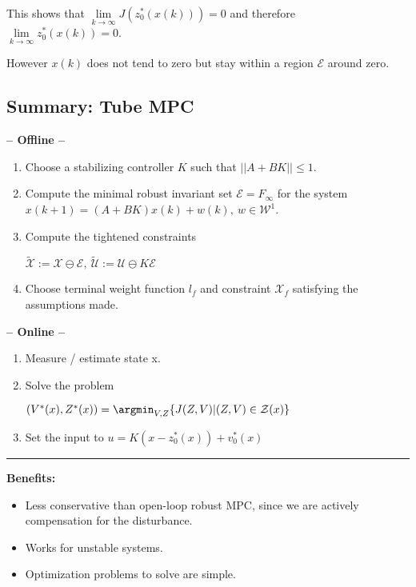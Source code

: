\documentclass[8pt,a4paper]{scrartcl}
\begin{document}
\begin{multicols*}{3}
\begin{multicols*}{4}
{This shows that $\lim\limits_{k\rightarrow\infty}J(z_0^\ast(x(k)))=0$ and therefore $\lim\limits_{k\rightarrow\infty}z_0^\ast(x(k))=0$.

\finn

However $x(k)$ does not tend to zero but stay within a region $\mathcal{E}$ around zero.
}%

\subsection{Summary: Tube MPC}

\textbf{-- Offline --}
\begin{enumerate}

\item Choose a stabilizing controller $K$ such that $||A+BK||\leq 1$.
\item Compute the minimal robust invariant set $\mathcal{E}=F_\infty$ for the system $x(k+1)=(A+BK)x(k)+w(k),\ w\in\mathcal{W}^1$.
\item Compute the tightened constraints 

$\tilde{\mathcal{X}}:=\mathcal{X}\ominus\mathcal{E},\ \tilde{\mathcal{U}}:=\mathcal{U}\ominus K\mathcal{E}$
\item Choose terminal weight function $l_f$ and constraint $\mathcal{X}_f$ satisfying the assumptions made.
\end{enumerate}

\textbf{-- Online --}
\begin{enumerate}
\compaq
\item Measure / estimate state x.
\item Solve the problem 

$(V^\ast(x),Z^\ast(x))=\argmin_{V,Z}\{J(Z,V)|(Z,V)\in\mathcal{Z}(x)\}$
\item Set the input to $u=K(x-z_0^\ast(x))+v_0^\ast(x)$
\end{enumerate}

\hrule

\finn

\textbf{Benefits:}
\begin{itemize}

\item Less conservative than open-loop robust MPC, since we are actively compensation for the disturbance.
\item Works for unstable systems.
\item Optimization problems to solve are simple.
\end{itemize}


\end{multicols*}
\end{multicols*}
\end{document}
